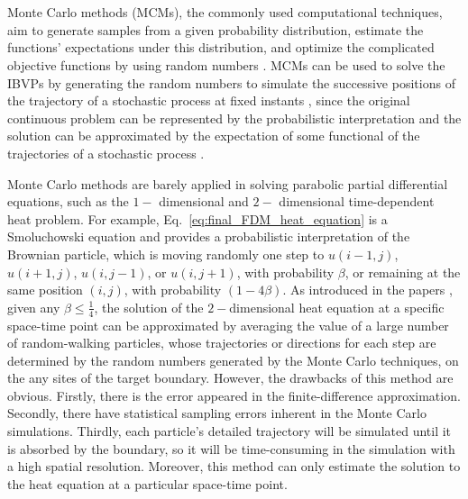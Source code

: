 \section{}


Monte Carlo methods (MCMs), the commonly used computational
techniques, aim to generate samples from a given probability
distribution, estimate the functions' expectations under this
distribution, and optimize the complicated objective functions by
using random numbers \cite{kroese2014monte}
\cite{rubinstein2016simulation}. MCMs can be used to solve the IBVPs
by generating the random numbers to simulate the successive positions
of the trajectory of a stochastic process at fixed instants
\cite{kronberg1976solution}\cite{king1951monte}, since the original
continuous problem can be represented by the probabilistic
interpretation and the solution can be approximated by the expectation
of some functional of the trajectories of a stochastic process
\cite{grebenkov2014efficient}\cite{sabelfeld2013random}.


Monte Carlo methods are barely applied in solving parabolic partial
differential equations, such as the $1-$ dimensional and $2-$
dimensional time-dependent heat problem. For example,
Eq.~\ref{eq:final_FDM_heat_equation} is a Smoluchowski equation
\cite{smoluchowski1916drei} and provides a probabilistic
interpretation of the Brownian particle, which is moving randomly one
step to $u(i-1, j)$, $u(i+1, j)$, $u(i, j-1)$, or $u(i, j+1)$, with
probability $\beta$, or remaining at the same position $(i, j)$, with
probability $(1-4\beta)$. As introduced in the papers
\cite{sadiku2006monte} \cite{gemjoz2017mcmheat}, given any $\beta \leq
\frac{1}{4}$, the solution of the $2-$dimensional heat equation at a
specific space-time point can be approximated by averaging the value
of a large number of random-walking particles, whose trajectories or
directions for each step are determined by the random numbers
generated by the Monte Carlo techniques, on the any sites of the
target boundary. However, the drawbacks of this method are
obvious. Firstly, there is the error appeared in the finite-difference
approximation. Secondly, there have statistical sampling errors
inherent in the Monte Carlo simulations. Thirdly, each particle's
detailed trajectory will be simulated until it is absorbed by the
boundary, so it will be time-consuming in the simulation with a high
spatial resolution. Moreover, this method can only estimate the
solution to the heat equation at a particular space-time point.


